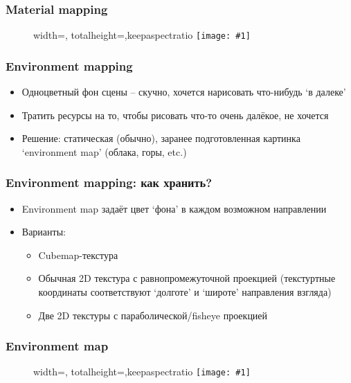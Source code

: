 \documentclass{beamer}
\newcommand{\slideimage}[1]{
  \begin{figure}
    \begin{adjustbox}{width=\textwidth, totalheight=\textheight-2\baselineskip-2\baselineskip,keepaspectratio}
      \texttt{[image: \#1]}
    \end{adjustbox}
  \end{figure}
}
\begin{document}
\begin{frame}[fragile]
\frametitle{Material mapping}
\slideimage{material_map.png}
\end{frame}

\begin{frame}[fragile]
\frametitle{Environment mapping}
\begin{itemize}
\item Одноцветный фон сцены -- скучно, хочется нарисовать что-нибудь `в далеке'
\pause
\item Тратить ресурсы на то, чтобы рисовать что-то очень далёкое, не хочется
\pause
\item Решение: статическая (обычно), заранее подготовленная картинка `environment map' (облака, горы, etc.)
\end{itemize}
\end{frame}

\begin{frame}[fragile]
\frametitle{Environment mapping: как хранить?}
\begin{itemize}
\item Environment map задаёт цвет `фона' в каждом возможном направлении
\pause
\item Варианты:
\begin{itemize}
\item Cubemap-текстура
\pause
\item Обычная 2D текстура с равнопромежуточной проекцией (текстуртные координаты соответствуют `долготе' и `широте' направления взгляда)
\pause
\item Две 2D текстуры с параболической/fisheye проекцией
\end{itemize}
\end{itemize}
\end{frame}

\begin{frame}[fragile]
\frametitle{Environment map}
\slideimage{env-map.jpg}
\end{frame}
\end{document}
